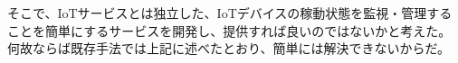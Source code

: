 そこで、IoTサービスとは独立した、IoTデバイスの稼動状態を監視・管理することを簡単にするサービスを開発し、提供すれば良いのではないかと考えた。
何故ならば既存手法では上記に述べたとおり、簡単には解決できないからだ。




